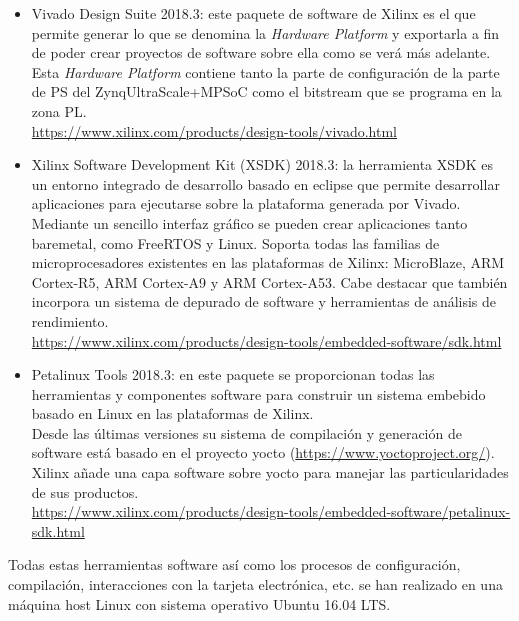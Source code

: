 \begin{itemize}
  \item Vivado Design Suite 2018.3: este paquete de software de Xilinx es el que permite generar lo que se denomina la \textit{Hardware Platform} y exportarla a fin de poder crear proyectos de software sobre ella como se verá más adelante. Esta \textit{Hardware Platform} contiene tanto la parte de configuración de la parte de PS del Zynq\textregistered UltraScale+\texttrademark MPSoC como el bitstream que se programa en la zona PL.\\
  \url{https://www.xilinx.com/products/design-tools/vivado.html}
  \item Xilinx Software Development Kit (XSDK) 2018.3: la herramienta \acrshort{XSDK} es un entorno integrado de desarrollo basado en eclipse que permite desarrollar aplicaciones para ejecutarse sobre la plataforma generada por Vivado. Mediante un sencillo interfaz gráfico se pueden crear aplicaciones tanto baremetal, como FreeRTOS y Linux. Soporta todas las familias de microprocesadores existentes en las plataformas de Xilinx: MicroBlaze, ARM Cortex-R5, ARM Cortex-A9 y ARM Cortex-A53. Cabe destacar que también incorpora un sistema de depurado de software y herramientas de análisis de rendimiento.\\
  \url{https://www.xilinx.com/products/design-tools/embedded-software/sdk.html}
  \item Petalinux Tools 2018.3: en este paquete se proporcionan todas las herramientas y componentes software para construir un sistema embebido basado en Linux en las plataformas de Xilinx.\\
  Desde las últimas versiones su sistema de compilación y generación de software está basado en el proyecto yocto (\url{https://www.yoctoproject.org/}). Xilinx añade una capa software sobre yocto para manejar las particularidades de sus productos.\\
  \url{https://www.xilinx.com/products/design-tools/embedded-software/petalinux-sdk.html}
\end{itemize}

Todas estas herramientas software así como los procesos de configuración, compilación, interacciones con la tarjeta electrónica, etc. se han realizado en una máquina host Linux con sistema operativo Ubuntu 16.04 LTS.
